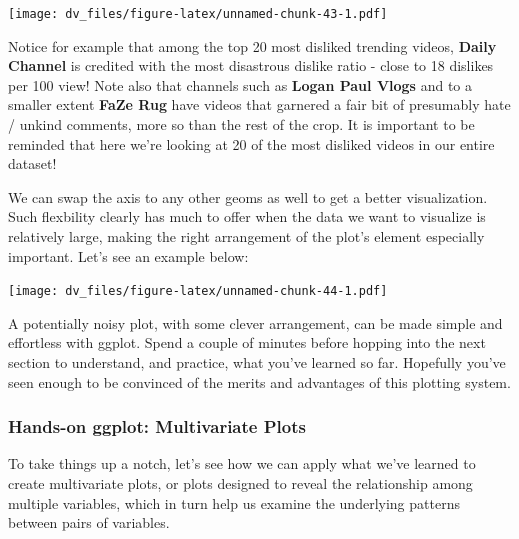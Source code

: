 \documentclass[]{article}
\newenvironment{Shaded}{\begin{snugshade}}{\end{snugshade}}
\newcommand{\DataTypeTok}[1]{\textcolor[rgb]{0.13,0.29,0.53}{#1}}
\newcommand{\KeywordTok}[1]{\textcolor[rgb]{0.13,0.29,0.53}{\textbf{#1}}}
\newcommand{\NormalTok}[1]{#1}
\newcommand{\OperatorTok}[1]{\textcolor[rgb]{0.81,0.36,0.00}{\textbf{#1}}}
\newcommand{\StringTok}[1]{\textcolor[rgb]{0.31,0.60,0.02}{#1}}
\begin{document}
\texttt{[image: dv\_files/figure-latex/unnamed-chunk-43-1.pdf]}

Notice for example that among the top 20 most disliked trending videos,
\textbf{Daily Channel} is credited with the most disastrous dislike
ratio - close to 18 dislikes per 100 view! Note also that channels such
as \textbf{Logan Paul Vlogs} and to a smaller extent \textbf{FaZe Rug}
have videos that garnered a fair bit of presumably hate / unkind
comments, more so than the rest of the crop. It is important to be
reminded that here we're looking at 20 of the most disliked videos in
our entire dataset!

We can swap the axis to any other geoms as well to get a better
visualization. Such flexbility clearly has much to offer when the data
we want to visualize is relatively large, making the right arrangement
of the plot's element especially important. Let's see an example below:

\begin{Shaded}
\end{Shaded}

\texttt{[image: dv\_files/figure-latex/unnamed-chunk-44-1.pdf]}

A potentially noisy plot, with some clever arrangement, can be made
simple and effortless with ggplot. Spend a couple of minutes before
hopping into the next section to understand, and practice, what you've
learned so far. Hopefully you've seen enough to be convinced of the
merits and advantages of this plotting system.

\hypertarget{hands-on-ggplot-multivariate-plots}{%
\subsubsection{Hands-on ggplot: Multivariate
Plots}\label{hands-on-ggplot-multivariate-plots}}

To take things up a notch, let's see how we can apply what we've learned
to create multivariate plots, or plots designed to reveal the
relationship among multiple variables, which in turn help us examine the
underlying patterns between pairs of variables.
\end{document}
